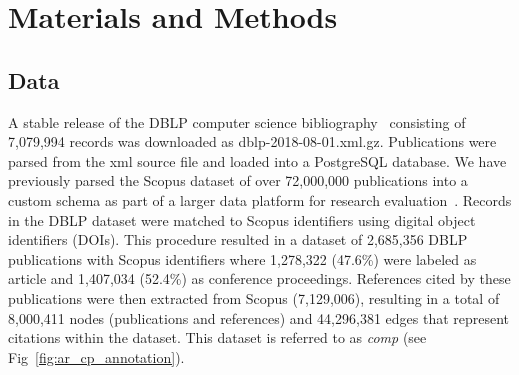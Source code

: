 \section{Materials and Methods}
\label{sec:methods}

\subsection{Data}
 A stable release of the DBLP computer science bibliography~\cite{dblp_ref} consisting of 7,079,994 records was downloaded as dblp-2018-08-01.xml.gz. Publications were parsed from the xml source file and loaded into a PostgreSQL database. We have previously parsed the Scopus dataset of over 72,000,000 publications into a custom schema as part of a larger data platform for research evaluation~\cite{GithubERNIE2019}. Records in the DBLP dataset were matched to Scopus identifiers using digital object identifiers (DOIs). This procedure resulted in a dataset of 2,685,356 DBLP publications with Scopus identifiers where 1,278,322 (47.6\%) were labeled as article and 1,407,034 (52.4\%) as conference proceedings. References cited by these publications were then extracted from Scopus (7,129,006), resulting in a total of 8,000,411 nodes (publications and references) and  44,296,381 edges that represent citations within the dataset. This dataset is referred to as \emph{comp} (see Fig~\ref{fig:ar_cp_annotation}).
 
